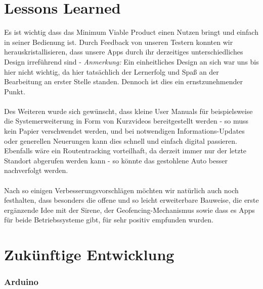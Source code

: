 \section{Lessons Learned}
Es ist wichtig dass das Minimum Viable Product einen Nutzen bringt und einfach in seiner Bedienung ist.\cite{Full2022}
Durch Feedback von unseren Testern konnten wir herauskristallisieren, dass unsere Apps durch ihr derzeitiges unterschiedliches Design irreführend sind - \textit{Anmerkung:} Ein einheitliches Design an sich war uns bis hier nicht wichtig, da hier tatsächlich der Lernerfolg und Spaß an der Bearbeitung an erster Stelle standen. Dennoch ist dies ein ernstzunehmender Punkt.
\\
\\
Des Weiteren wurde sich gewünscht, dass kleine User Manuals für beispielsweise die Systemerweiterung in Form von Kurzvideos bereitgestellt werden - so muss kein Papier verschwendet werden, und bei notwendigen Informations-Updates oder generellen Neuerungen kann dies schnell und einfach digital passieren. Ebenfalls wäre ein Routentracking vorteilhaft, da derzeit immer nur der letzte Standort abgerufen werden kann - so könnte das gestohlene Auto besser nachverfolgt werden. 
\\
\\
Nach so einigen Verbesserungsvorschlägen möchten wir natürlich auch noch festhalten, dass besonders die offene und so leicht erweiterbare Bauweise, die erste ergänzende Idee mit der Sirene, der Geofencing-Mechanismus sowie dass es Apps für beide Betriebssysteme gibt, für sehr positiv empfunden wurden.




\section{Zukünftige Entwicklung}

\subsubsection{Arduino}

